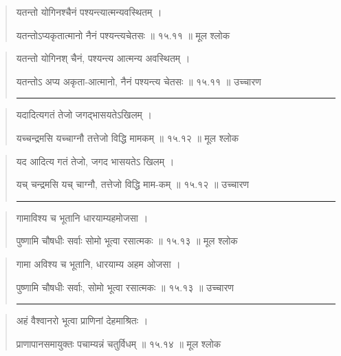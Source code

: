 \begin{quotation}

यतन्तो योगिनश्चैनं पश्यन्त्यात्मन्यवस्थितम्‌  ।  

यतन्तोऽप्यकृतात्मानो नैनं पश्यन्त्यचेतसः  ॥ १५.११ ॥  मूल श्लोक
\end{quotation}

\begin{quotation}

यतन्तो योगिनश् चैनं, पश्यन्त्य आत्मन्य अवस्थितम्‌  ।  

यतन्तोऽ अप्य अकृता-आत्मानो, नैनं पश्यन्त्य चेतसः  ॥ १५.११ ॥  उच्चारण

\noindent\rule{16cm}{0.4pt} 
\end{quotation}


\begin{quotation}

यदादित्यगतं तेजो जगद्भासयतेऽखिलम्‌  ।  

यच्चन्द्रमसि यच्चाग्नौ तत्तेजो विद्धि मामकम्‌  ॥ १५.१२ ॥  मूल श्लोक
\end{quotation}

\begin{quotation}

यद आदित्य गतं तेजो, जगद  भासयतेऽ खिलम्‌  ।  

यच् चन्द्रमसि यच् चाग्नौ, तत्तेजो विद्धि माम-कम्‌  ॥ १५.१२ ॥  उच्चारण

\noindent\rule{16cm}{0.4pt} 
\end{quotation}


\begin{quotation}

गामाविश्य च भूतानि धारयाम्यहमोजसा  ।  

पुष्णामि चौषधीः सर्वाः सोमो भूत्वा रसात्मकः  ॥ १५.१३ ॥  मूल श्लोक
\end{quotation}

\begin{quotation}

गामा अविश्य च भूतानि, धारयाम्य अहम ओजसा  ।  

पुष्णामि चौषधीः सर्वाः, सोमो भूत्वा रसात्मकः  ॥ १५.१३ ॥  उच्चारण

\noindent\rule{16cm}{0.4pt} 
\end{quotation}


\begin{quotation}

अहं वैश्वानरो भूत्वा प्राणिनां देहमाश्रितः  ।  

प्राणापानसमायुक्तः पचाम्यन्नं चतुर्विधम्‌  ॥ १५.१४ ॥  मूल श्लोक
\end{quotation}

